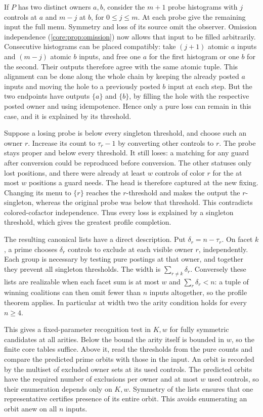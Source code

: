 If $P$ has two distinct owners $a,b$, consider the $m+1$
probe histograms with $j$ controls at $a$ and $m-j$ at $b$,
for $0\le j\le m$. At each probe give the remaining input
the full menu. Symmetry and loss of its source omit the
observer. Omission independence
(\cref{core:prop:omission}) now allows that input to be
filled arbitrarily. Consecutive histograms can be placed
compatibly: take $(j+1)$ atomic $a$ inputs and $(m-j)$
atomic $b$ inputs, and free one $a$ for the first histogram
or one $b$ for the second. Their outputs therefore agree
with the same atomic tuple. This alignment can be done
along the whole chain by keeping the already posted $a$
inputs and moving the hole to a previously posted $b$
input at each step. But the two endpoints have outputs $\{a\}$
and $\{b\}$, by filling the hole with the respective
posted owner and using idempotence. Hence only a pure loss
can remain in this case, and it is explained by its threshold.

Suppose a losing probe is below every singleton threshold,
and choose such an owner $r$. Increase its count to
$\tau_r-1$ by converting other controls to $r$.
The probe stays proper and below every threshold. It still
loses: a matching for any guard after conversion could be
reproduced before conversion. The other statuses only lost
positions, and there were already at least $w$ controls
of color $r$ for the at most $w$ positions a guard needs.
The head is therefore captured at the new fixing. Changing
its menu to $\{r\}$ reaches the $r$-threshold and makes the
output the $r$-singleton, whereas the original probe was
below that threshold. This contradicts colored-cofactor
independence. Thus every loss is explained by a singleton
threshold, which gives the greatest profile completion.

The resulting canonical lists have a direct description.
Put $\delta_r=n-\tau_r$. On facet $k$, a prime chooses
$\delta_r$ controls to exclude at each visible owner $r$,
independently. Each group is necessary by testing pure
postings at that owner, and together they prevent all
singleton thresholds. The width is $\sum_{r\ne k}\delta_r$.
Conversely these lists are realizable when each facet sum
is at most $w$ and $\sum_r\delta_r<n$: a tuple of winning
coalitions can then omit fewer than $n$ inputs altogether,
so the profile theorem applies. In particular at width two
the arity condition holds for every $n\ge4$.

This gives a fixed-parameter recognition test in $K,w$ for
fully symmetric candidates at all arities. Below the bound
the arity itself is bounded in $w$, so the finite core tables
suffice. Above it, read the thresholds from the pure counts
and compare the predicted prime orbits with those in the
input. An orbit is recorded by the multiset of excluded
owner sets at its used controls. The predicted orbits have
the required number of exclusions per owner and at most
$w$ used controls, so their enumeration depends only on
$K,w$. Symmetry of the lists ensures that one representative
certifies presence of its entire orbit. This avoids enumerating
an orbit anew on all $n$ inputs.

